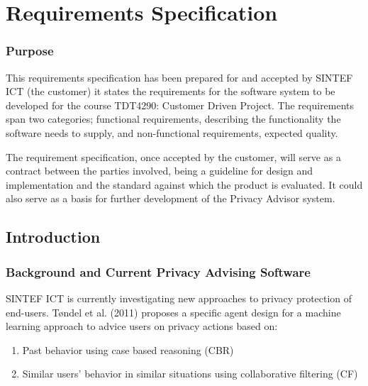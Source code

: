 

\chapter{Requirements Specification}\label{reqspec}

\minitoc

\subsection*{Purpose}
This requirements specification has been prepared for and accepted by SINTEF ICT (the customer) it states the requirements for the software system to be developed for the course TDT4290: Customer Driven Project. The requirements span two categories; functional requirements, describing the functionality the software needs to supply, and non-functional requirements, expected quality.

The requirement specification, once accepted by the customer, will serve as a contract between the parties involved, being a guideline for design and implementation and the standard against which the product is evaluated. It could also serve as a basis for further development of the Privacy Advisor system.

\section{Introduction}
\subsection{Background and Current Privacy Advising Software}
SINTEF ICT is currently investigating new approaches to privacy protection of end-users. T{\o}ndel et al. (2011) proposes a specific agent design for a machine learning approach to advice users on privacy actions based on:

\begin{enumerate}
\item Past behavior using case based reasoning (CBR)
\item Similar users' behavior in similar situations using collaborative filtering (CF)
\end{enumerate}

